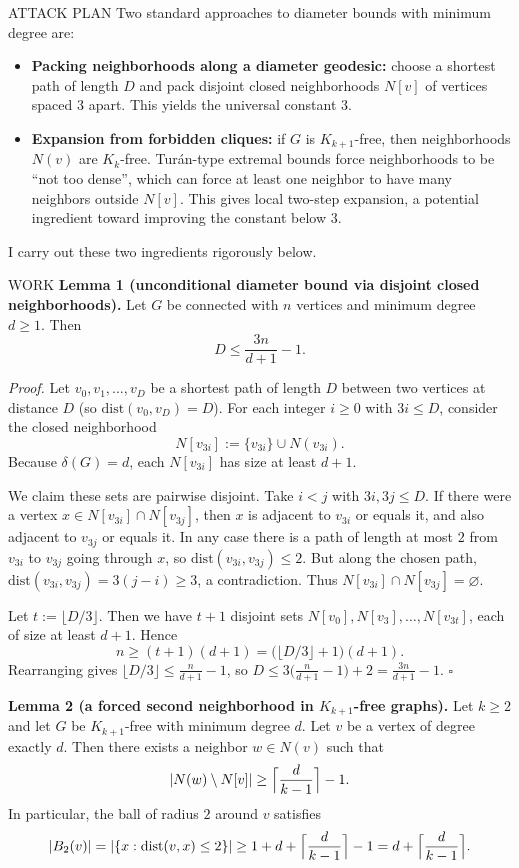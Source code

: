 ATTACK PLAN
Two standard approaches to diameter bounds with minimum degree are:
\begin{itemize}
\item \textbf{Packing neighborhoods along a diameter geodesic:}
choose a shortest path of length $D$ and pack disjoint closed neighborhoods
$N[v]$ of vertices spaced $3$ apart. This yields the universal constant $3$.
\item \textbf{Expansion from forbidden cliques:}
if $G$ is $K_{k+1}$-free, then neighborhoods $N(v)$ are $K_k$-free.
Tur\'an-type extremal bounds force neighborhoods to be ``not too dense'', which
can force at least one neighbor to have many neighbors outside $N[v]$.
This gives local two-step expansion, a potential ingredient toward improving the
constant below $3$.
\end{itemize}
I carry out these two ingredients rigorously below.

WORK
\textbf{Lemma 1 (unconditional diameter bound via disjoint closed neighborhoods).}
Let $G$ be connected with $n$ vertices and minimum degree $d\ge1$.
Then
\[
D \le \frac{3n}{d+1}-1.
\]

\emph{Proof.}
Let $v_0,v_1,\dots,v_D$ be a shortest path of length $D$ between two vertices at
distance $D$ (so $\mathrm{dist}(v_0,v_D)=D$). For each integer $i\ge0$ with
$3i\le D$, consider the closed neighborhood
\[
N[v_{3i}] := \{v_{3i}\}\cup N(v_{3i}).
\]
Because $\delta(G)=d$, each $N[v_{3i}]$ has size at least $d+1$.

We claim these sets are pairwise disjoint.
Take $i<j$ with $3i,3j\le D$.
If there were a vertex $x\in N[v_{3i}]\cap N[v_{3j}]$, then
$x$ is adjacent to $v_{3i}$ or equals it, and also adjacent to $v_{3j}$ or equals it.
In any case there is a path of length at most $2$ from $v_{3i}$ to $v_{3j}$ going
through $x$, so
$\mathrm{dist}(v_{3i},v_{3j})\le 2$.
But along the chosen path, $\mathrm{dist}(v_{3i},v_{3j})=3(j-i)\ge 3$, a contradiction.
Thus $N[v_{3i}]\cap N[v_{3j}]=\varnothing$.

Let $t:=\lfloor D/3\rfloor$. Then we have $t+1$ disjoint sets
$N[v_0],N[v_3],\dots,N[v_{3t}]$, each of size at least $d+1$.
Hence
\[
 n \ge (t+1)(d+1) = \bigl(\lfloor D/3\rfloor+1\bigr)(d+1).
\]
Rearranging gives
$\lfloor D/3\rfloor \le \frac{n}{d+1}-1$, so
$D \le 3\bigl(\frac{n}{d+1}-1\bigr)+2 = \frac{3n}{d+1}-1$.
\hfill $\square$

\medskip
\textbf{Lemma 2 (a forced second neighborhood in $K_{k+1}$-free graphs).}
Let $k\ge2$ and let $G$ be $K_{k+1}$-free with minimum degree $d$.
Let $v$ be a vertex of degree exactly $d$.
Then there exists a neighbor $w\in N(v)$ such that
\[
|N(w)\setminus N[v]| \ge \Bigl\lceil \frac{d}{k-1}\Bigr\rceil - 1.
\]
In particular, the ball of radius $2$ around $v$ satisfies
\[
|B_2(v)|=|\{x:\mathrm{dist}(v,x)\le2\}| \ge 1+d+\Bigl\lceil\frac{d}{k-1}\Bigr\rceil-1
= d+\Bigl\lceil\frac{d}{k-1}\Bigr\rceil.
\]

